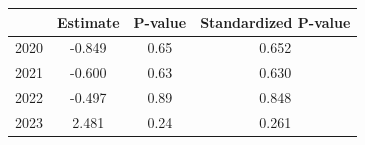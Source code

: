 \begin{tabular}{lccc}
\hline
 & Estimate & P-value & Standardized P-value \\
\hline
2020 & -0.849 & 0.65 & 0.652 \\
2021 & -0.600 & 0.63 & 0.630 \\
2022 & -0.497 & 0.89 & 0.848 \\
2023 & 2.481 & 0.24 & 0.261 \\
\hline
\end{tabular}
